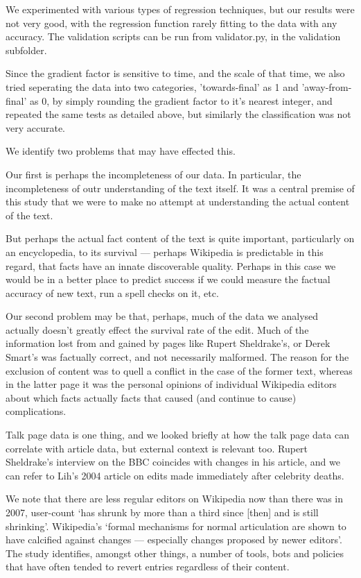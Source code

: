 We experimented with various types of regression techniques, but our
results were not very good, with the regression function rarely
fitting to the data with any accuracy. The validation scripts can be
run from validator.py, in the validation subfolder.

Since the gradient factor is sensitive to time, and the scale of that
time, we also tried seperating the data into two categories,
'towards-final' as 1 and 'away-from-final' as 0, by simply rounding
the gradient factor to it's nearest integer, and repeated the same
tests as detailed above, but similarly the classification was not very
accurate.

We identify two problems that may have effected this. 

Our first is perhaps the incompleteness of our data. In particular,
the incompleteness of outr understanding of the text itself. It was a
central premise of this study that we were to make no attempt at
understanding the actual content of the text.

But perhaps the actual fact content of the text is quite important,
particularly on an encyclopedia, to its survival --- perhaps Wikipedia
is predictable in this regard, that facts have an innate discoverable
quality. Perhaps in this case we would be in a better place to predict
success if we could measure the factual accuracy of new text, run a
spell checks on it, etc.

Our second problem may be that, perhaps, much of the data we analysed
actually doesn't greatly effect the survival rate of the edit. Much of
the information lost from and gained by pages like Rupert Sheldrake's,
or Derek Smart's was factually correct, and not necessarily
malformed. The reason for the exclusion of content was to quell a
conflict in the case of the former text, whereas in the latter page it
was the personal opinions of individual Wikipedia editors about which
facts actually  facts that caused (and continue to cause)
complications.

Talk page data is one thing, and we looked briefly at how the talk
page data can correlate with article data, but external context is
relevant too. Rupert Sheldrake's interview on the BBC coincides with
changes in his article, and we can refer to Lih's 2004 article on
edits made immediately after celebrity deaths.

We note that there are less regular editors on Wikipedia now than
there was in 2007, user-count `has shrunk by more than a third since
[then] and is still shrinking'.\cite{wiki-decline} Wikipedia's `formal
mechanisms for normal articulation are shown to have calcified against
changes –-- especially changes proposed by newer
editors'.\cite{wiki-decline-2} The study identifies, amongst other
things, a number of tools, bots and policies that have often tended to
revert entries regardless of their content.

